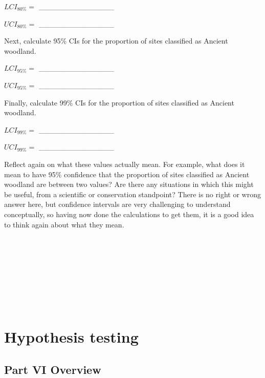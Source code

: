 \documentclass[
]{scrbook}
\begin{document}
\(LCI_{80\%} =\) \_\_\_\_\_\_\_\_\_\_\_\_\_\_

\(UCI_{80\%} =\) \_\_\_\_\_\_\_\_\_\_\_\_\_\_

Next, calculate 95\% CIs for the proportion of sites classified as Ancient woodland.

\(LCI_{95\%} =\) \_\_\_\_\_\_\_\_\_\_\_\_\_\_

\(UCI_{95\%} =\) \_\_\_\_\_\_\_\_\_\_\_\_\_\_

Finally, calculate 99\% CIs for the proportion of sites classified as Ancient woodland.

\(LCI_{99\%} =\) \_\_\_\_\_\_\_\_\_\_\_\_\_\_

\(UCI_{99\%} =\) \_\_\_\_\_\_\_\_\_\_\_\_\_\_

Reflect again on what these values actually mean.
For example, what does it mean to have 95\% confidence that the proportion of sites classified as Ancient woodland are between two values?
Are there any situations in which this might be useful, from a scientific or conservation standpoint?
There is no right or wrong answer here, but confidence intervals are very challenging to understand conceptually, so having now done the calculations to get them, it is a good idea to think again about what they mean.

\begin{verbatim}








\end{verbatim}

\hypertarget{part-hypothesis-testing}{%
\part{Hypothesis testing}\label{part-hypothesis-testing}}

\hypertarget{Week6}{%
\chapter*{Part VI Overview}\label{Week6}}
\end{document}
